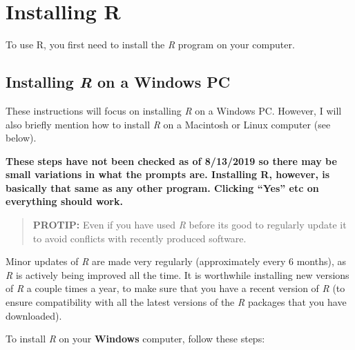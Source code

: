\documentclass[
]{book}
\begin{document}
\hypertarget{installing-r}{%
\section{Installing R}\label{installing-r}}

To use R, you first need to install the \emph{R} program on your computer.

\hypertarget{installing-r-on-a-windows-pc}{%
\subsection{\texorpdfstring{Installing \emph{R} on a Windows PC}{Installing R on a Windows PC}}\label{installing-r-on-a-windows-pc}}

These instructions will focus on installing \emph{R} on a Windows PC. However, I will also briefly mention how to install \emph{R} on a Macintosh or Linux computer (see below).

\textbf{These steps have not been checked as of 8/13/2019 so there may be small variations in what the prompts are. Installing R, however, is basically that same as any other program. Clicking ``Yes'' etc on everything should work.}

\begin{quote}
\textbf{PROTIP:} Even if you have used \emph{R} before its good to regularly update it to avoid conflicts with recently produced software.
\end{quote}

Minor updates of \emph{R} are made very regularly (approximately every 6 months), as \emph{R} is actively being improved all the time. It is worthwhile installing new versions of \emph{R} a couple times a year, to make sure that you have a recent version of \emph{R} (to ensure compatibility with all the latest versions of the \emph{R} packages that you have downloaded).

To install \emph{R} on your \textbf{Windows} computer, follow these steps:
\end{document}
